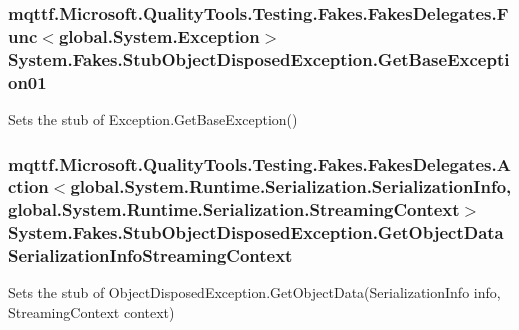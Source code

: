 \hypertarget{class_system_1_1_fakes_1_1_stub_object_disposed_exception_aaa78b112d16864a7beaa3d7e19313e39}{
\subsubsection[{Get\-Base\-Exception01}]{\setlength{\rightskip}{0pt plus 5cm}mqttf.\-Microsoft.\-Quality\-Tools.\-Testing.\-Fakes.\-Fakes\-Delegates.\-Func$<$global.\-System.\-Exception$>$ System.\-Fakes.\-Stub\-Object\-Disposed\-Exception.\-Get\-Base\-Exception01}}\label{class_system_1_1_fakes_1_1_stub_object_disposed_exception_aaa78b112d16864a7beaa3d7e19313e39}


Sets the stub of Exception.\-Get\-Base\-Exception()

\hypertarget{class_system_1_1_fakes_1_1_stub_object_disposed_exception_a46144bfe697be1835b1e4a1adcb2c08d}{
\subsubsection[{Get\-Object\-Data\-Serialization\-Info\-Streaming\-Context}]{\setlength{\rightskip}{0pt plus 5cm}mqttf.\-Microsoft.\-Quality\-Tools.\-Testing.\-Fakes.\-Fakes\-Delegates.\-Action$<$global.\-System.\-Runtime.\-Serialization.\-Serialization\-Info, global.\-System.\-Runtime.\-Serialization.\-Streaming\-Context$>$ System.\-Fakes.\-Stub\-Object\-Disposed\-Exception.\-Get\-Object\-Data\-Serialization\-Info\-Streaming\-Context}}\label{class_system_1_1_fakes_1_1_stub_object_disposed_exception_a46144bfe697be1835b1e4a1adcb2c08d}


Sets the stub of Object\-Disposed\-Exception.\-Get\-Object\-Data(\-Serialization\-Info info, Streaming\-Context context)

